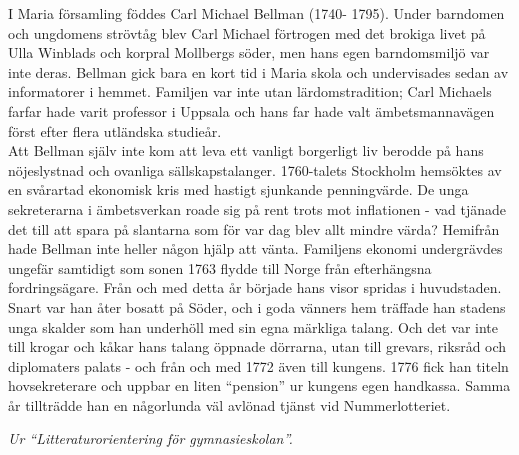 \vspace{10pt}
\hspace{10pt}I Maria församling föddes Carl Michael Bellman (1740-
1795). Under barndomen och ungdomens strövtåg blev Carl 
Michael förtrogen med det brokiga livet på Ulla Winblads och 
korpral Mollbergs söder, men hans egen barndomsmiljö var inte 
deras. Bellman gick bara en kort tid i Maria skola och 
undervisades sedan av informatorer i hemmet. Familjen var inte 
utan lärdomstradition; Carl Michaels farfar hade varit professor i 
Uppsala och hans far hade valt ämbetsmannavägen först efter 
flera utländska studieår.\\
\indent Att Bellman själv inte kom att leva ett vanligt borgerligt 
liv berodde på hans nöjeslystnad och ovanliga sällskapstalanger. 
1760-talets Stockholm hemsöktes av en svårartad ekonomisk kris 
med hastigt sjunkande penningvärde. De unga sekreterarna i 
ämbetsverkan roade sig på rent trots mot inflationen - vad 
tjänade det till att spara på slantarna som för var dag blev 
allt mindre värda? Hemifrån hade Bellman inte heller någon 
hjälp att vänta. Familjens ekonomi undergrävdes ungefär samtidigt som 
sonen 1763 flydde till Norge från efterhängsna fordringsägare. 
Från och med detta år började hans visor spridas i huvudstaden. 
Snart var han åter bosatt på Söder, och i goda vänners hem 
träffade han stadens unga skalder som han underhöll med sin 
egna märkliga talang. Och det var inte till krogar och kåkar hans 
talang öppnade dörrarna, utan till grevars, riksråd och 
diplomaters palats - och från och med 1772 även till kungens. 
1776 fick han titeln hovsekreterare och uppbar en liten 
``pension'' ur kungens egen handkassa. Samma år tillträdde han en 
någorlunda väl avlönad tjänst vid Nummerlotteriet.\par
\vspace{10pt}
{\footnotesize\textit{Ur ``Litteraturorientering för gymnasieskolan''.}}
